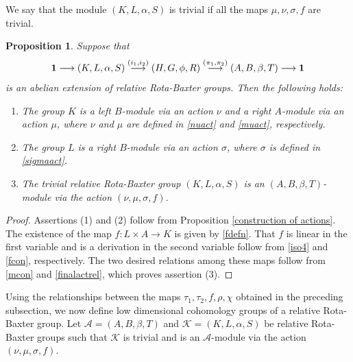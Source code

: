 \documentclass[11pt]{amsart}
\theoremstyle{thrm}
\theoremstyle{plain}
\newtheorem{prop}[thm]{Proposition}
\theoremstyle{definition}
\numberwithin{equation}{section}
\begin{document}
We say that the module $(K, L, \alpha, S)$ is trivial if all the maps $\mu, \nu, \sigma, f$ are trivial. 

\begin{prop}\label{module structure from extension}
	Suppose that $${\bf 1} \longrightarrow (K,L, \alpha,S ) \stackrel{(i_1, i_2)}{\longrightarrow}  (H,G, \phi, R) \stackrel{(\pi_1, \pi_2)}{\longrightarrow} (A,B, \beta, T) \longrightarrow {\bf 1}$$
	is an abelian extension of relative Rota-Baxter groups. Then  the following holds:
	\begin{enumerate}
		\item The group $K$ is a left $B$-module via an action $\nu$  and a right $A$-module via an action $\mu$, where $\nu$ and $\mu$ are defined in \eqref{nuact} and  \eqref{muact}, respectively.
		\item The group $L$ is a right $B$-module via an action $\sigma$, where $\sigma$ is defined in \eqref{sigmaact}.
		\item  The trivial relative Rota-Baxter group $(K, L, \alpha, S)$ is an $(A,B, \beta, T)$-module via the action $(\nu, \mu, \sigma, f)$.
	\end{enumerate}
\end{prop}
\begin{proof}
	Assertions (1) and (2) follow from Proposition \ref{construction of actions}. The existence of the map $f: L \times A \to K$ is given by \eqref{fdefn}. That $f$ is linear in the first variable and is a derivation in the second variable follow from \eqref{iso4} and \eqref{fcon}, respectively. The two desired relations among these maps follow from \eqref{mcon} and  \eqref{finalactrel}, which proves assertion (3).
\end{proof}



Using the relationships between the maps $\tau_1, \tau_2, f,\rho,\chi$ obtained in the preceding subsection,  we now define low dimensional cohomology groups of a  relative Rota-Baxter group. Let $\mathcal{A}=(A, B, \beta, T)$ and $\mathcal{K}=(K, L, \alpha, S)$ be  relative Rota-Baxter groups such that   $\mathcal{K}$ is trivial and is an $\mathcal{A}$-module via the action $(\nu, \mu, \sigma, f)$.
\medskip 
\end{document}
